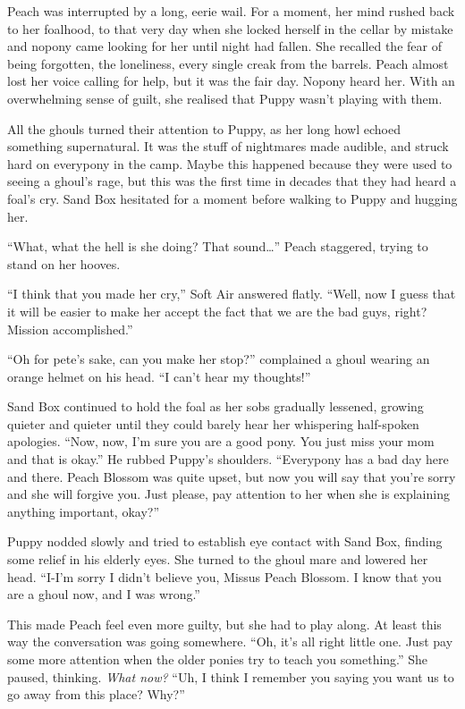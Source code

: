 Peach was interrupted by a long, eerie wail. For a moment, her mind rushed back to her foalhood, to that very day when she locked herself in the cellar by mistake and nopony came looking for her until night had fallen. She recalled the fear of being forgotten, the loneliness, every single creak from the barrels. Peach almost lost her voice calling for help, but it was the fair day. Nopony heard her. With an overwhelming sense of guilt, she realised that Puppy wasn't playing with them.

All the ghouls turned their attention to Puppy, as her long howl echoed something supernatural. It was the stuff of nightmares made audible, and struck hard on everypony in the camp. Maybe this happened because they were used to seeing a ghoul's rage, but this was the first time in decades that they had heard a foal's cry. Sand Box hesitated for a moment before walking to Puppy and hugging her.

``What, what the hell is she doing? That sound\dots'' Peach staggered, trying to stand on her hooves.

``I think that you made her cry,'' Soft Air answered flatly. ``Well, now I guess that it will be easier to make her accept the fact that we are the bad guys, right? Mission accomplished.''

``Oh for pete's sake, can you make her stop?'' complained a ghoul wearing an orange helmet on his head. ``I can't hear my thoughts!''

Sand Box continued to hold the foal as her sobs gradually lessened, growing quieter and quieter until they could barely hear her whispering half-spoken apologies. ``Now, now, I'm sure you are a good pony. You just miss your mom and that is okay.'' He rubbed Puppy's shoulders. ``Everypony has a bad day here and there. Peach Blossom was quite upset, but now you will say that you're sorry and she will forgive you. Just please, pay attention to her when she is explaining anything important, okay?''

Puppy nodded slowly and tried to establish eye contact with Sand Box, finding some relief in his elderly eyes. She turned to the ghoul mare and lowered her head. ``I-I'm sorry I didn't believe you, Missus Peach Blossom. I know that you are a ghoul now, and I was wrong.''

This made Peach feel even more guilty, but she had to play along. At least this way the conversation was going somewhere. ``Oh, it's all right little one. Just pay some more attention when the older ponies try to teach you something.'' She paused, thinking. \emph{What now?} ``Uh, I think I remember you saying you want us to go away from this place? Why?''

